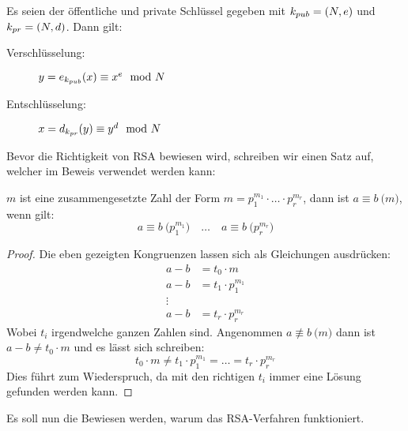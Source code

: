 \begin{definition}
  Es seien der öffentliche und private Schlüssel gegeben mit
  $k_{pub} = (N,e)$ und $k_{pr} = (N,d)$. Dann gilt:
  \begin{description}
    \item[Verschlüsselung:] $y = e_{k_{pub}}(x) \equiv x^e \mod{N}$
    \item[Entschlüsselung:] $x = d_{k_{pr}}(y) \equiv y^d \mod{N}$
  \end{description}
\end{definition}

\noindent
Bevor die Richtigkeit von RSA bewiesen wird, schreiben wir einen Satz auf, welcher im
Beweis verwendet werden kann:

\begin{satz}
  \label{satz:composite-mod}
  $m$ ist eine zusammengesetzte Zahl der Form $m = p_1^{m_1} \cdot \ldots \cdot p_r^{m_r}$, dann
  ist $a \equiv b \pod{m}$, wenn gilt:
  \begin{equation*}
    a \equiv b \pod{p_1^{m_1}} \quad\ldots\quad a \equiv b \pod{p_r^{m_r}}
  \end{equation*}
\end{satz}
\begin{proof}
  Die eben gezeigten Kongruenzen lassen sich als Gleichungen ausdrücken:
  \begin{align*}
    a - b & = t_0 \cdot m         \\
    a - b & = t_1 \cdot p_1^{m_1} \\
    \vdots                        \\
    a - b & = t_r \cdot p_r^{m_r}
  \end{align*}
  Wobei $t_i$ irgendwelche ganzen Zahlen sind. Angenommen $a \not\equiv b \pod{m}$ dann ist
  $a - b \neq t_0 \cdot m$ und es lässt sich schreiben:
  \begin{equation*}
    t_0 \cdot m \neq t_1 \cdot p_1^{m_1} = \ldots = t_r \cdot p_r^{m_r}
  \end{equation*}
  Dies führt zum Wiederspruch, da mit den richtigen $t_i$ immer eine Lösung gefunden werden kann.
\end{proof}

\noindent
Es soll nun die Bewiesen werden, warum das RSA-Verfahren funktioniert.

